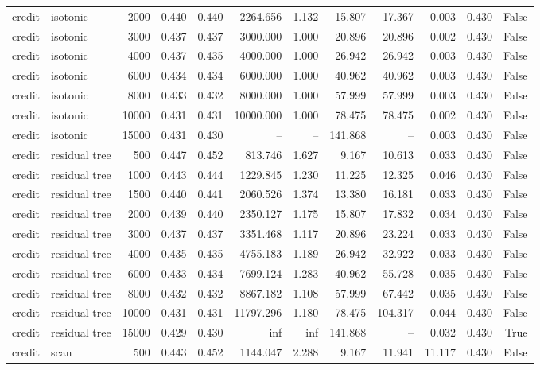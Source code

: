 \begin{tabular}{llrrrrrrrrrr}
credit & isotonic & 2000 & 0.440 & 0.440 & 2264.656 & 1.132 & 15.807 & 17.367 & 0.003 & 0.430 & False \\
credit & isotonic & 3000 & 0.437 & 0.437 & 3000.000 & 1.000 & 20.896 & 20.896 & 0.002 & 0.430 & False \\
credit & isotonic & 4000 & 0.437 & 0.435 & 4000.000 & 1.000 & 26.942 & 26.942 & 0.003 & 0.430 & False \\
credit & isotonic & 6000 & 0.434 & 0.434 & 6000.000 & 1.000 & 40.962 & 40.962 & 0.003 & 0.430 & False \\
credit & isotonic & 8000 & 0.433 & 0.432 & 8000.000 & 1.000 & 57.999 & 57.999 & 0.003 & 0.430 & False \\
credit & isotonic & 10000 & 0.431 & 0.431 & 10000.000 & 1.000 & 78.475 & 78.475 & 0.002 & 0.430 & False \\
credit & isotonic & 15000 & 0.431 & 0.430 & -- & -- & 141.868 & -- & 0.003 & 0.430 & False \\
credit & residual tree & 500 & 0.447 & 0.452 & 813.746 & 1.627 & 9.167 & 10.613 & 0.033 & 0.430 & False \\
credit & residual tree & 1000 & 0.443 & 0.444 & 1229.845 & 1.230 & 11.225 & 12.325 & 0.046 & 0.430 & False \\
credit & residual tree & 1500 & 0.440 & 0.441 & 2060.526 & 1.374 & 13.380 & 16.181 & 0.033 & 0.430 & False \\
credit & residual tree & 2000 & 0.439 & 0.440 & 2350.127 & 1.175 & 15.807 & 17.832 & 0.034 & 0.430 & False \\
credit & residual tree & 3000 & 0.437 & 0.437 & 3351.468 & 1.117 & 20.896 & 23.224 & 0.033 & 0.430 & False \\
credit & residual tree & 4000 & 0.435 & 0.435 & 4755.183 & 1.189 & 26.942 & 32.922 & 0.033 & 0.430 & False \\
credit & residual tree & 6000 & 0.433 & 0.434 & 7699.124 & 1.283 & 40.962 & 55.728 & 0.035 & 0.430 & False \\
credit & residual tree & 8000 & 0.432 & 0.432 & 8867.182 & 1.108 & 57.999 & 67.442 & 0.035 & 0.430 & False \\
credit & residual tree & 10000 & 0.431 & 0.431 & 11797.296 & 1.180 & 78.475 & 104.317 & 0.044 & 0.430 & False \\
credit & residual tree & 15000 & 0.429 & 0.430 & inf & inf & 141.868 & -- & 0.032 & 0.430 & True \\
credit & scan & 500 & 0.443 & 0.452 & 1144.047 & 2.288 & 9.167 & 11.941 & 11.117 & 0.430 & False \\

\end{tabular}
